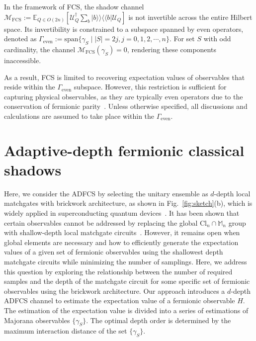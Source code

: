 \documentclass[journal=jctcce,a4paper,manuscript=article]{achemso}
\newcommand{\supket}[1]{|#1 \rangle\rangle}
\newcommand{\supbra}[1]{\langle\langle #1 |}
\newcommand{\sbra}[1]{\left[ #1 \right]}
\newcommand{\Ucal}{\mathcal{U}}
\newcommand{\Mbb}{\mathbb{M}}
\newcommand{\Ebb}{\mathbb{E}}
\begin{document}
In the framework of FCS, the shadow channel
$\mathcal{M}_{\text{FCS}}:=\Ebb_{Q\in O(2n)}\sbra{\Ucal_{Q}^{\dagger}\sum_{b}
    \supket{b}\supbra{b} \Ucal_Q}$ is not invertible across the entire Hilbert
space. Its invertibility is constrained to a subspace spanned by even
operators, denoted as $ \Gamma_{\text{even}} := \mathrm{span}\{ \gamma_S \mid
  |S| = 2j, j=0,1,2,\cdots, n\}.$ For set $S$ with odd cardinality, the channel
$\mathcal{M}_{\text{FCS}}(\gamma_S) = 0$, rendering these components
inaccessible.

As a result, FCS is limited to recovering expectation values of observables
that reside within the $\Gamma_{\text{even}}$ subspace. However, this
restriction is sufficient for capturing physical observables, as they are
typically even operators due to the conservation of fermionic
parity~\cite{turner2011topological}. Unless otherwise specified, all
discussions and calculations are assumed to take place within the
$\Gamma_{\text{even}}$.

\section{Adaptive-depth fermionic classical shadows}

Here, we consider the ADFCS by selecting the unitary ensemble as $d$-depth
local matchgates with brickwork architecture, as shown in
Fig.~\ref{fig:sketch}(b), which is widely applied in superconducting quantum
devices~\cite{arute2019quantum}. It has been shown that certain observables
cannot be addressed by replacing the global Cl$_n \cap \Mbb_n$ group with
shallow-depth local matchgate circuits~\cite{Zhao21Fermionic}. However, it
remains open when global elements are necessary and how to efficiently generate
the expectation values of a given set of fermionic observables using the
shallowest depth matchgate circuits while minimizing the number of samplings.
Here, we address this question by exploring the relationship between the number
of required samples and the depth of the matchgate circuit for some specific
set of fermionic observables using the brickwork architecture. {Our approach
    introduces a $d$-depth ADFCS channel to estimate the expectation value of a
    fermionic observable $H$. The estimation of the expectation value is divided
    into a series of estimations of Majorana observables $\{\gamma_S\}$. The
    optimal depth order is determined by the maximum interaction distance of the
    set $\{\gamma_S\}$. }
\end{document}

